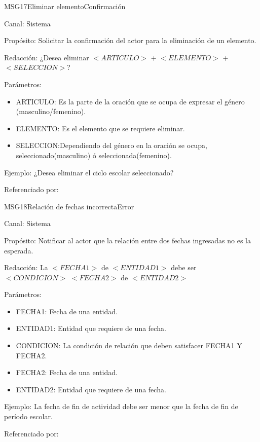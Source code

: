 \begin{mensaje}{MSG17}{Eliminar elemento}{Confirmación}
	\item[Canal:] Sistema
	\item[Propósito:] Solicitar la confirmación del actor para la eliminación de un elemento.
	\item[Redacción:] ¿Desea eliminar $<ARTICULO>$ + $<ELEMENTO>$ + $<SELECCION>$?
	\item[Parámetros:] 
	\begin{itemize}
		\item ARTICULO: Es la parte de la oración que se ocupa de expresar el género (masculino/femenino).
		\item ELEMENTO: Es el elemento que se requiere eliminar.
		\item SELECCION:Dependiendo del género en la oración se ocupa, seleccionado(masculino)  ó seleccionada(femenino).
	\end{itemize}
	\item[Ejemplo:] ¿Desea eliminar el ciclo escolar seleccionado?
	\item[Referenciado por: ] 
\end{mensaje}

\begin{mensaje}{MSG18}{Relación de fechas incorrecta}{Error}
	\item[Canal:] Sistema
	\item[Propósito:] Notificar al actor que la relación entre dos fechas ingresadas no es la esperada.
	\item[Redacción:] La $<FECHA1>$ de $<ENTIDAD1>$ debe ser $<CONDICION>$ $<FECHA2>$ de $<ENTIDAD2>$
	\item[Parámetros:] 
	\begin{itemize}
		\item FECHA1: Fecha de una entidad.
		\item ENTIDAD1: Entidad que requiere de una fecha.
		\item CONDICION: La condición de relación que deben satisfacer FECHA1 Y FECHA2.
		\item FECHA2: Fecha de una entidad.
		\item ENTIDAD2: Entidad que requiere de una fecha.
	\end{itemize}
	\item[Ejemplo:] La fecha de fin de actividad debe ser menor que la fecha de fin de período escolar.
	\item[Referenciado por: ] 
\end{mensaje}


